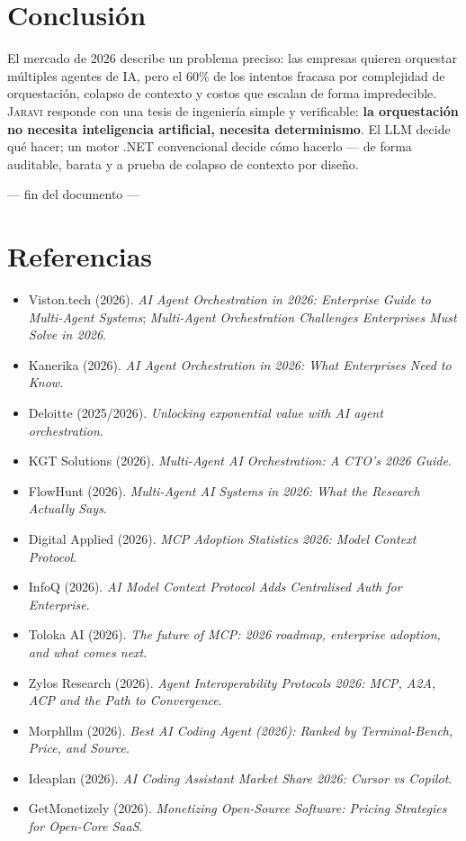 \documentclass[11pt]{article}
\newcommand{\jaravi}{\textsc{Jaravi}\xspace}
\begin{document}
\section{Conclusión}

El mercado de 2026 describe un problema preciso: las empresas quieren orquestar múltiples agentes de IA, pero el 60\% de los intentos fracasa por complejidad de orquestación, colapso de contexto y costos que escalan de forma impredecible. \jaravi responde con una tesis de ingeniería simple y verificable: \textbf{la orquestación no necesita inteligencia artificial, necesita determinismo}. El LLM decide qué hacer; un motor .NET convencional decide cómo hacerlo --- de forma auditable, barata y a prueba de colapso de contexto por diseño.

\vspace{1cm}
\begin{center}
{\sffamily\small\color{jaravimuted} --- fin del documento ---}
\end{center}

\newpage
\section*{Referencias}
\small
\begin{itemize}[leftmargin=1.2em]
\item Viston.tech (2026). \textit{AI Agent Orchestration in 2026: Enterprise Guide to Multi-Agent Systems}; \textit{Multi-Agent Orchestration Challenges Enterprises Must Solve in 2026}.
\item Kanerika (2026). \textit{AI Agent Orchestration in 2026: What Enterprises Need to Know}.
\item Deloitte (2025/2026). \textit{Unlocking exponential value with AI agent orchestration}.
\item KGT Solutions (2026). \textit{Multi-Agent AI Orchestration: A CTO's 2026 Guide}.
\item FlowHunt (2026). \textit{Multi-Agent AI Systems in 2026: What the Research Actually Says}.
\item Digital Applied (2026). \textit{MCP Adoption Statistics 2026: Model Context Protocol}.
\item InfoQ (2026). \textit{AI Model Context Protocol Adds Centralised Auth for Enterprise}.
\item Toloka AI (2026). \textit{The future of MCP: 2026 roadmap, enterprise adoption, and what comes next}.
\item Zylos Research (2026). \textit{Agent Interoperability Protocols 2026: MCP, A2A, ACP and the Path to Convergence}.
\item Morphllm (2026). \textit{Best AI Coding Agent (2026): Ranked by Terminal-Bench, Price, and Source}.
\item Ideaplan (2026). \textit{AI Coding Assistant Market Share 2026: Cursor vs Copilot}.
\item GetMonetizely (2026). \textit{Monetizing Open-Source Software: Pricing Strategies for Open-Core SaaS}.
\end{itemize}
\end{document}

